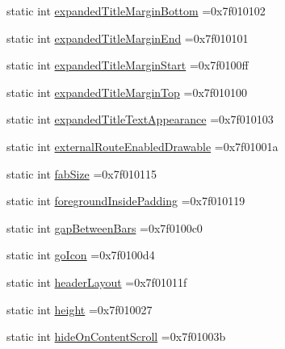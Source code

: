 \begin{DoxyCompactItemize}
\item 
static int \hyperlink{classandroid_1_1support_1_1graphics_1_1drawable_1_1R_1_1attr_aa1ee679f6eb9a21bf97688b9f45a9062}{expanded\+Title\+Margin\+Bottom} =0x7f010102
\item 
static int \hyperlink{classandroid_1_1support_1_1graphics_1_1drawable_1_1R_1_1attr_a1964b53327df6ecd236bdaffeb357314}{expanded\+Title\+Margin\+End} =0x7f010101
\item 
static int \hyperlink{classandroid_1_1support_1_1graphics_1_1drawable_1_1R_1_1attr_aef2bbf1973c8562d1a0c5546601aa88a}{expanded\+Title\+Margin\+Start} =0x7f0100ff
\item 
static int \hyperlink{classandroid_1_1support_1_1graphics_1_1drawable_1_1R_1_1attr_aa8ebc42935a8b920de21fdac8e90f706}{expanded\+Title\+Margin\+Top} =0x7f010100
\item 
static int \hyperlink{classandroid_1_1support_1_1graphics_1_1drawable_1_1R_1_1attr_a5bc73a60706985226bdafe5f9ba2d715}{expanded\+Title\+Text\+Appearance} =0x7f010103
\item 
static int \hyperlink{classandroid_1_1support_1_1graphics_1_1drawable_1_1R_1_1attr_a97e1c334c47151e6c3cb732ec5d6df90}{external\+Route\+Enabled\+Drawable} =0x7f01001a
\item 
static int \hyperlink{classandroid_1_1support_1_1graphics_1_1drawable_1_1R_1_1attr_a67b102360575ba55657da14ea8cd493f}{fab\+Size} =0x7f010115
\item 
static int \hyperlink{classandroid_1_1support_1_1graphics_1_1drawable_1_1R_1_1attr_af2e2ee2b9e4c25e41bdc010f634b5196}{foreground\+Inside\+Padding} =0x7f010119
\item 
static int \hyperlink{classandroid_1_1support_1_1graphics_1_1drawable_1_1R_1_1attr_aea16c56befc9fdf7b650752777d63e89}{gap\+Between\+Bars} =0x7f0100c0
\item 
static int \hyperlink{classandroid_1_1support_1_1graphics_1_1drawable_1_1R_1_1attr_a261d168454bebe98931642009996a2e5}{go\+Icon} =0x7f0100d4
\item 
static int \hyperlink{classandroid_1_1support_1_1graphics_1_1drawable_1_1R_1_1attr_acf33b1be6a8a1797b55f6f10c4f57d50}{header\+Layout} =0x7f01011f
\item 
static int \hyperlink{classandroid_1_1support_1_1graphics_1_1drawable_1_1R_1_1attr_a97e156b2d44569c998b0f678ab185513}{height} =0x7f010027
\item 
static int \hyperlink{classandroid_1_1support_1_1graphics_1_1drawable_1_1R_1_1attr_a93d2d5b37143c04b42c4bc085886a1a7}{hide\+On\+Content\+Scroll} =0x7f01003b

\end{DoxyCompactItemize}
